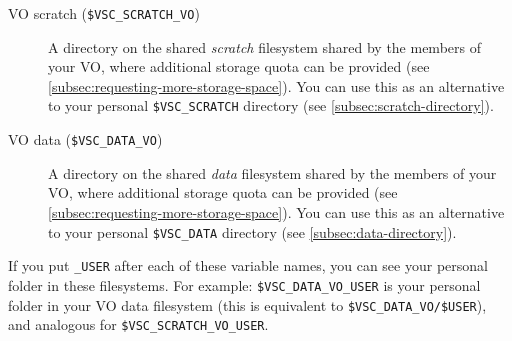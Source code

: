\begin{description}
    \item[VO scratch (\texttt{\$VSC\_SCRATCH\_VO})]
        A directory on the shared \emph{scratch} filesystem shared by the members of your
        VO, where additional storage quota can be provided (see \autoref{subsec:requesting-more-storage-space}).
        You can use this as an alternative to your personal \lstinline|$VSC_SCRATCH|
        directory (see \autoref{subsec:scratch-directory}).

    \item[VO data (\texttt{\$VSC\_DATA\_VO})]
        A directory on the shared \emph{data} filesystem shared by the members of your
        VO, where additional storage quota can be provided (see \autoref{subsec:requesting-more-storage-space}).
        You can use this as an alternative to your personal \lstinline|$VSC_DATA|
        directory (see \autoref{subsec:data-directory}).

\end{description}

If you put \lstinline|_USER| after each of these variable names, you can see your
personal folder in these filesystems. For example: \lstinline|$VSC_DATA_VO_USER|
is your personal folder in your VO data filesystem (this is equivalent to
\lstinline|$VSC_DATA_VO/$USER|), and analogous for \lstinline|$VSC_SCRATCH_VO_USER|.

\fi\fi
